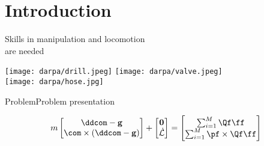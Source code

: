 \section{Introduction}

\begin{frame}{Skills in manipulation and locomotion\\ are needed}
\begin{center}
  \vspace*{0.7cm}
  \texttt{[image: darpa/drill.jpeg]}
  \hspace*{0.5cm}
  \texttt{[image: darpa/valve.jpeg]}\\[0.2cm]
  \texttt{[image: darpa/hose.jpg]}
\end{center}
\end{frame}


\begin{frame}{Problem}{Problem presentation}

\begin{equation}
  \label{eq:equilibrium_constraints}
  m
  \begin{bmatrix}
  \ddcom - {\bf g} \\
  \com \times (\ddcom - {\bf g})
  \end{bmatrix}
  +
  \begin{bmatrix}
  {\bf 0} \\
  \dot{\mathcal{L}}
  \end{bmatrix}
  =
  \begin{bmatrix}
  \sum_{i=1}^{M}
  \Qf \ff \\
  \sum_{i=1}^{M}
  \pf \times \Qf  \ff
\end{bmatrix}
\end{equation}


\end{frame}